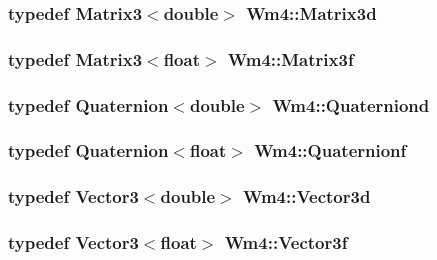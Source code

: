 \subsubsection{\setlength{\rightskip}{0pt plus 5cm}typedef {\bf Matrix3}$<$double$>$ {\bf Wm4::Matrix3d}}\label{namespaceWm4_5a2568194b95499ce70ee2c63b659ba0}


\subsubsection{\setlength{\rightskip}{0pt plus 5cm}typedef {\bf Matrix3}$<$float$>$ {\bf Wm4::Matrix3f}}\label{namespaceWm4_2e453cf8fd471529ebb216f6af3b8327}


\subsubsection{\setlength{\rightskip}{0pt plus 5cm}typedef {\bf Quaternion}$<$double$>$ {\bf Wm4::Quaterniond}}\label{namespaceWm4_7fc3d5a1f317da69e7a8d160ad6a58dd}


\subsubsection{\setlength{\rightskip}{0pt plus 5cm}typedef {\bf Quaternion}$<$float$>$ {\bf Wm4::Quaternionf}}\label{namespaceWm4_9d5fcfdca7a8d5f6fa7b0e881edc4824}


\subsubsection{\setlength{\rightskip}{0pt plus 5cm}typedef {\bf Vector3}$<$double$>$ {\bf Wm4::Vector3d}}\label{namespaceWm4_e32b89f10ad530ea25c9f82f8adb7fcd}


\subsubsection{\setlength{\rightskip}{0pt plus 5cm}typedef {\bf Vector3}$<$float$>$ {\bf Wm4::Vector3f}}\label{namespaceWm4_6dced9b2b09795128098afa9ac887f88}




